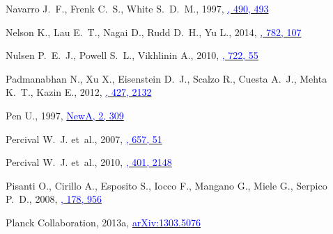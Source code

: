 \documentclass[useAMS,usenatbib,usegraphicx]{mn2e}
\begin{document}
\begin{thebibliography}{}
{Navarro} J.~F., {Frenk} C.~S.,  {White} S.~D.~M., 1997,
  \href{http://adsabs.harvard.edu/abs/1997ApJ...490..493N}{\textcolor{blue}{\apj,
  490, 493}}

{Nelson} K., {Lau} E.~T., {Nagai} D., {Rudd} D.~H.,  {Yu} L., 2014,
  \href{http://adsabs.harvard.edu/abs/2014ApJ...782..107N}{\textcolor{blue}{\apj,
  782, 107}}

{Nulsen} P.~E.~J., {Powell} S.~L.,  {Vikhlinin} A., 2010,
  \href{http://adsabs.harvard.edu/abs/2010ApJ...722...55N}{\textcolor{blue}{\apj,
  722, 55}}

{Padmanabhan} N., {Xu} X., {Eisenstein} D.~J., {Scalzo} R., {Cuesta} A.~J.,
  {Mehta} K.~T.,  {Kazin} E., 2012,
  \href{http://adsabs.harvard.edu/abs/2012MNRAS.427.2132P}{\textcolor{blue}{\mnras,
  427, 2132}}

{Pen} U., 1997,
  \href{http://adsabs.harvard.edu/abs/1997NewA....2..309P}{\textcolor{blue}{NewA,
  2, 309}}

{Percival} W.~J. et~al., 2007,
  \href{http://adsabs.harvard.edu/abs/2007ApJ...657...51P}{\textcolor{blue}{\apj,
  657, 51}}

{Percival} W.~J. et~al., 2010,
  \href{http://adsabs.harvard.edu/abs/2010MNRAS.401.2148P}{\textcolor{blue}{\mnras,
  401, 2148}}

{Pisanti} O., {Cirillo} A., {Esposito} S., {Iocco} F., {Mangano} G., {Miele}
  G.,  {Serpico} P.~D., 2008,
  \href{http://adsabs.harvard.edu/abs/2008CoPhC.178..956P}{\textcolor{blue}{\compcom,
  178, 956}}

{Planck Collaboration}, 2013a,
  \href{http://arxiv.org/abs/1303.5076}{\textcolor{blue}{arXiv:1303.5076}}


\end{thebibliography}
\end{document}
